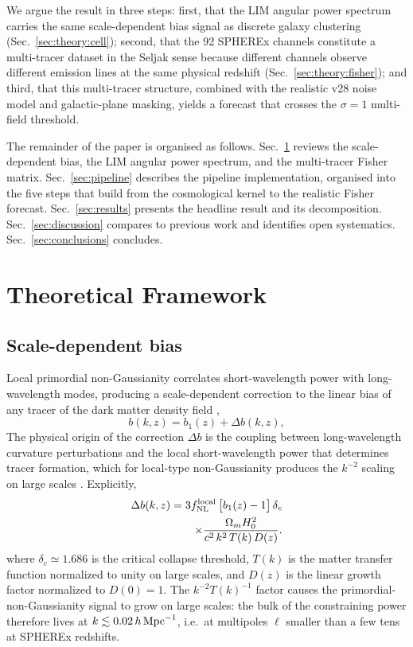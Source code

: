 \documentclass[twocolumn,prd,nofootinbib,superscriptaddress,floatfix,11pt]{revtex4-2}
\begin{document}
We argue the result in three steps: first, that the LIM angular power spectrum carries the same scale-dependent bias signal as discrete galaxy clustering (Sec.~\ref{sec:theory:cell}); second, that the 92 SPHEREx channels constitute a multi-tracer dataset in the Seljak sense because different channels observe different emission lines at the same physical redshift (Sec.~\ref{sec:theory:fisher}); and third, that this multi-tracer structure, combined with the realistic v28 noise model and galactic-plane masking, yields a forecast that crosses the $\sigma=1$ multi-field threshold.

The remainder of the paper is organised as follows.  Sec.~\ref{sec:theory} reviews the scale-dependent bias, the LIM angular power spectrum, and the multi-tracer Fisher matrix.  Sec.~\ref{sec:pipeline} describes the pipeline implementation, organised into the five steps that build from the cosmological kernel to the realistic Fisher forecast.  Sec.~\ref{sec:results} presents the headline result and its decomposition.  Sec.~\ref{sec:discussion} compares to previous work and identifies open systematics.  Sec.~\ref{sec:conclusions} concludes.

\section{Theoretical Framework}
\label{sec:theory}
\FloatBarrier

\subsection{Scale-dependent bias}
\label{sec:theory:bias}

Local primordial non-Gaussianity correlates short-wavelength power with long-wavelength modes, producing a scale-dependent correction to the linear bias of any tracer of the dark matter density field \citep{Dalal2008,LoVerde2008},
\begin{equation}
b(k,z) = b_1(z) + \Delta b(k,z),
\label{eq:bias-total}
\end{equation}
The physical origin of the correction $\Delta b$ is the coupling between long-wavelength curvature perturbations and the local short-wavelength power that determines tracer formation, which for local-type non-Gaussianity produces the $k^{-2}$ scaling on large scales \citep{Dalal2008}.  Explicitly,
\begin{align}
\Delta b(k,z) = 3 f_{\rm NL}^{\rm local}\,\bigl[b_1(z)-1\bigr]\,\delta_c \nonumber \\
\times \frac{\Omega_m H_0^2}{c^2\, k^2\, T(k)\, D(z)}.
\label{eq:bias-delta}
\end{align}
where $\delta_c \simeq 1.686$ is the critical collapse threshold, $T(k)$ is the matter transfer function normalized to unity on large scales, and $D(z)$ is the linear growth factor normalized to $D(0)=1$.  The $k^{-2}T(k)^{-1}$ factor causes the primordial-non-Gaussianity signal to grow on large scales: the bulk of the constraining power therefore lives at $k \lesssim 0.02\,h\,{\rm Mpc}^{-1}$, i.e.\ at multipoles $\ell$ smaller than a few tens at SPHEREx redshifts.
\end{document}
